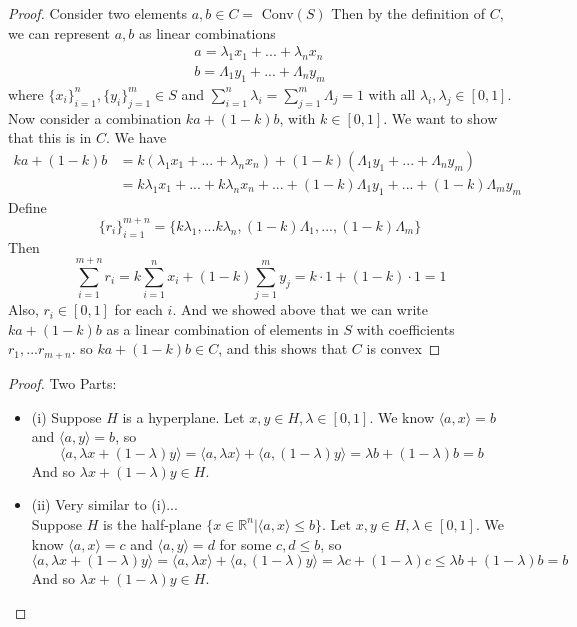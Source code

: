 \documentclass[12pt]{article}
\newenvironment{problem}[2][Problem]{\begin{trivlist}
\item[\hskip \labelsep {\bfseries #1}\hskip \labelsep {\bfseries #2.}]}{\end{trivlist}}
\theoremstyle{definition}
\theoremstyle{definition}
\theoremstyle{definition}
\theoremstyle{definition}
\begin{document}
\begin{problem}{7.1}
\begin{proof}
Consider two elements $a, b \in C =$ Conv$(S)$ Then by the definition of $C$, we can represent $a, b$ as linear combinations \begin{align*}
a = \lambda_1 x_1 + ... + \lambda_n x_n \\
b = \Lambda_1 y_1 + ... + \Lambda_n y_m  
\end{align*}
where $\{ x_i \}_{i=1}^n, \{ y_i \}_{j=1}^m \in S$ and $\sum_{i=1}^n \lambda_i = \sum_{j=1}^m \Lambda_j = 1$ with all $\lambda_i, \lambda_j \in [0,1]$. \\
Now consider a combination $ka + (1-k)b$, with $k\in[0,1]$. We want to show that this is in $C$. We have 
\begin{align*}
ka + (1-k)b &= k(\lambda_1 x_1 + ... + \lambda_n x_n) + (1-k)(\Lambda_1 y_1 + ... + \Lambda_n y_m)\\
&= k\lambda_1 x_1 +... + k\lambda_n x_n + ... + (1-k) \Lambda_1 y_1 + ... + (1-k) \Lambda_m y_m
\end{align*}
Define $$\{ r_i \}_{i=1}^{m+n} = \{ k\lambda_1, ... k\lambda_n, (1-k)\Lambda_1, ... , (1-k)\Lambda_m \} $$
Then $$\sum_{i=1}^{m+n} r_i = k \sum_{i=1}^n x_i + (1-k) \sum_{j=1}^m y_j = k \cdot 1 + (1-k) \cdot 1 = 1$$ 
Also, $r_i \in [0, 1]$ for each $i$. And we showed above that we can write $ka + (1-k)b$ as a linear combination of elements in $S$ with coefficients $r_1, ... r_{m+n}$. so $ka + (1-k)b \in C$, and this shows that $C$ is convex 
\end{proof}
\end{problem}

\begin{problem}{7.2} \begin{proof} Two Parts:
\begin{itemize}
\item (i)
Suppose $H$ is a hyperplane. Let $x, y \in H, \lambda \in [0,1]$. We know $\langle a, x \rangle = b$ and $\langle a, y \rangle = b$, so 
$$ \langle a, \lambda x + (1 - \lambda) y \rangle = \langle a, \lambda x \rangle + \langle a, (1 - \lambda)y \rangle = \lambda b + (1 - \lambda) b = b
$$
And so $\lambda x + (1-\lambda) y \in H$.
\item (ii) Very similar to (i)... \\
Suppose $H$ is the half-plane $\{ x \in \mathbb{R}^n | \langle a, x \rangle \leq b\}$. Let $x, y \in H, \lambda \in [0,1]$. We know $\langle a, x \rangle = c$ and $\langle a, y \rangle = d$ for some $c, d \leq b$, so 
$$ \langle a, \lambda x + (1 - \lambda) y \rangle = \langle a, \lambda x \rangle + \langle a, (1 - \lambda)y \rangle = \lambda c + (1 - \lambda) c \leq \lambda b + (1 - \lambda) b = b
$$
And so $\lambda x + (1-\lambda) y \in H$.
\end{itemize}
\end{proof}
\end{problem}
\end{document}
